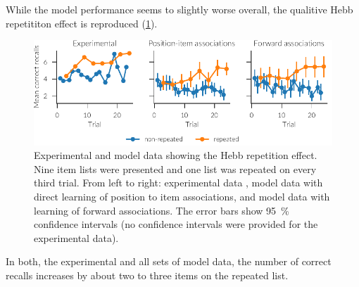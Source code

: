 While the model performance seems to slightly worse overall, the qualitive Hebb repetititon effect is reproduced (\cref{fig:hebb}).
\begin{figure}
    \centering
    \includegraphics{figures/hebb}
    \caption[Hebb repetition effect.]{Experimental and model data showing the Hebb repetition effect. Nine item lists were presented and one list was repeated on every third trial. From left to right: experimental data \parencite{Hebb1961}, model data with direct learning of position to item associations, and model data with learning of forward associations. The error bars show \SI{95}{\percent} confidence intervals (no confidence intervals were provided for the experimental data).}\label{fig:hebb}
\end{figure}
In both, the experimental and all sets of model data, the number of correct recalls increases by about two to three items on the repeated list.


